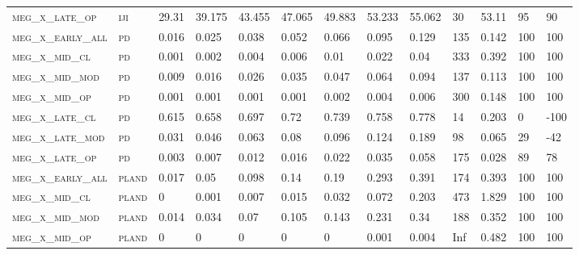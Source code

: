 \begin{landscape}
\begin{center}
\begin{footnotesize}
\begin{longtable}{lllllllllllll}
\textsc{meg\_x\_late\_op  } & \textsc{iji       }   & 29.31    & 39.175   & 43.455   & 47.065   & 49.883   & 53.233   & 55.062    & 30     & 53.11         & 95            & 90            \\
\textsc{meg\_x\_early\_all} & \textsc{pd        }   & 0.016    & 0.025    & 0.038    & 0.052    & 0.066    & 0.095    & 0.129     & 135    & 0.142         & 100           & 100           \\
\textsc{meg\_x\_mid\_cl   } & \textsc{pd        }   & 0.001    & 0.002    & 0.004    & 0.006    & 0.01     & 0.022    & 0.04      & 333    & 0.392         & 100           & 100           \\
\textsc{meg\_x\_mid\_mod  } & \textsc{pd        }   & 0.009    & 0.016    & 0.026    & 0.035    & 0.047    & 0.064    & 0.094     & 137    & 0.113         & 100           & 100           \\
\textsc{meg\_x\_mid\_op   } & \textsc{pd        }   & 0.001    & 0.001    & 0.001    & 0.001    & 0.002    & 0.004    & 0.006     & 300    & 0.148         & 100           & 100           \\
\textsc{meg\_x\_late\_cl  } & \textsc{pd        }   & 0.615    & 0.658    & 0.697    & 0.72     & 0.739    & 0.758    & 0.778     & 14     & 0.203         & 0             & -100          \\
\textsc{meg\_x\_late\_mod } & \textsc{pd        }   & 0.031    & 0.046    & 0.063    & 0.08     & 0.096    & 0.124    & 0.189     & 98     & 0.065         & 29            & -42           \\
\textsc{meg\_x\_late\_op  } & \textsc{pd        }   & 0.003    & 0.007    & 0.012    & 0.016    & 0.022    & 0.035    & 0.058     & 175    & 0.028         & 89            & 78            \\
\textsc{meg\_x\_early\_all} & \textsc{pland     }   & 0.017    & 0.05     & 0.098    & 0.14     & 0.19     & 0.293    & 0.391     & 174    & 0.393         & 100           & 100           \\
\textsc{meg\_x\_mid\_cl   } & \textsc{pland     }   & 0        & 0.001    & 0.007    & 0.015    & 0.032    & 0.072    & 0.203     & 473    & 1.829         & 100           & 100           \\
\textsc{meg\_x\_mid\_mod  } & \textsc{pland     }   & 0.014    & 0.034    & 0.07     & 0.105    & 0.143    & 0.231    & 0.34      & 188    & 0.352         & 100           & 100           \\
\textsc{meg\_x\_mid\_op   } & \textsc{pland     }   & 0        & 0        & 0        & 0        & 0        & 0.001    & 0.004     & Inf    & 0.482         & 100           & 100           \\

\end{longtable}
\end{footnotesize}
\end{center}
\end{landscape}

